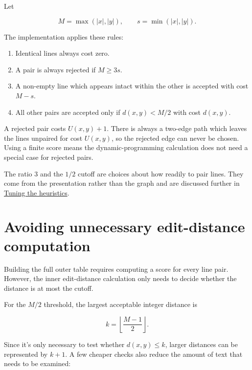 \documentclass[
]{article}
\providecommand{\tightlist}{%
  \setlength{\itemsep}{0pt}\setlength{\parskip}{0pt}}
\begin{document}
Let

\[M=\max(|x|,|y|), \qquad s=\min(|x|,|y|).\]

The implementation applies these rules:

\begin{enumerate}
\def\labelenumi{\arabic{enumi}.}
\tightlist
\item
  Identical lines always cost zero.
\item
  A pair is always rejected if \(M \geq 3s\).
\item
  A non-empty line which appears intact within the other is accepted
  with cost \(M-s\).
\item
  All other pairs are accepted only if \(d(x,y)<M/2\) with cost
  \(d(x,y)\).
\end{enumerate}

A rejected pair costs \(U(x,y)+1\). There is always a two-edge path
which leaves the lines unpaired for cost \(U(x,y)\), so the rejected
edge can never be chosen. Using a finite score means the
dynamic-programming calculation does not need a special case for
rejected pairs.

The ratio \(3\) and the \(1/2\) cutoff are choices about how readily to
pair lines. They come from the presentation rather than the graph and
are discussed further in
\protect\hyperlink{tuning-the-heuristics}{Tuning the heuristics}.

\hypertarget{avoiding-unnecessary-edit-distance-computation}{%
\section{Avoiding unnecessary edit-distance
computation}\label{avoiding-unnecessary-edit-distance-computation}}

Building the full outer table requires computing a score for every line
pair. However, the inner edit-distance calculation only needs to decide
whether the distance is at most the cutoff.

For the \(M/2\) threshold, the largest acceptable integer distance is

\[k=\left\lfloor\frac{M-1}{2}\right\rfloor.\]

Since it's only necessary to test whether \(d(x,y)\leq k\), larger
distances can be represented by \(k+1\). A few cheaper checks also
reduce the amount of text that needs to be examined:
\end{document}

